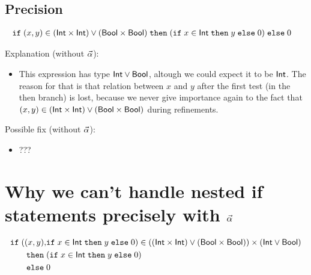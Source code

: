 \documentclass[a4paper]{article}
\theoremstyle{definition}
\begin{document}
    \subsection{Precision}

    \begin{align*}
      &\texttt{if}\;(x,y)\in(\text{\textsf{Int}}\times \text{\textsf{Int}}) \vee (\text{\textsf{Bool}}\times \text{\textsf{Bool}})\;\texttt{then}\;
        (\texttt{if}\;x\in\text{\textsf{Int}}\;\texttt{then}\;y\;\texttt{else}\;0)
      \;\texttt{else}\;0
    \end{align*}

    Explanation (without $\vec \alpha$):
    \begin{itemize}
      \item This expression has type $\text{\textsf{Int}} \vee \text{\textsf{Bool}}$, altough we could expect it to be $\text{\textsf{Int}}$.
      The reason for that is that relation between $x$ and $y$ after the first test (in the then branch) is lost,
      because we never give importance again to the fact that $(x,y)\in(\text{\textsf{Int}}\times \text{\textsf{Int}})\vee(\text{\textsf{Bool}}\times \text{\textsf{Bool}})$ during refinements.
    \end{itemize}

    Possible fix (without $\vec \alpha$):
    \begin{itemize}
      \item ???
    \end{itemize}
    
    \section{Why we can't handle nested if statements precisely with $\vec \alpha$}

    \begin{align*}
      \texttt{if}\;((x,y), &\texttt{if}\;x\in\text{\textsf{Int}}\;\texttt{then}\;y\;\texttt{else}\;0)\in((\text{\textsf{Int}}\times \text{\textsf{Int}}) \vee (\text{\textsf{Bool}}\times \text{\textsf{Bool}}))\times (\text{\textsf{Int}} \vee \text{\textsf{Bool}})\\\;\texttt{then}\;&(\texttt{if}\;x\in\text{\textsf{Int}}\;\texttt{then}\;y\;\texttt{else}\;0)\\\;\texttt{else}\;&0
    \end{align*}
\end{document}
